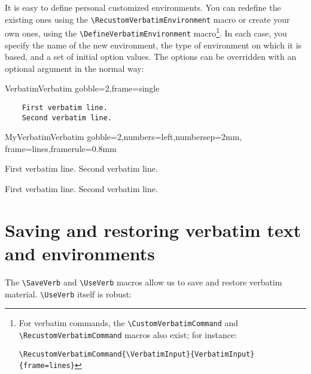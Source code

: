 \documentclass[twoside]{article}
\newif\ifChangeBar \ChangeBarfalse
\newcommand\cs[1]{\texttt{\textbackslash#1}}
\begin{document}
\ifChangeBar\begin{changebar}\fi
\VerbatimFootnotes
  It is easy to define personal customized environments. You can redefine
the existing ones using the \cs{RecustomVerbatimEnvironment} macro or create
your own ones, using the \cs{DefineVerbatimEnvironment} macro\footnote{%
\ifChangeBar\begin{changebar}\fi
For verbatim commands, the \cs{CustomVerbatimCommand} and
\cs{RecustomVerbatimCommand} macros also exist; for instance:

\noindent
\verb+\RecustomVerbatimCommand{\VerbatimInput}{VerbatimInput}{frame=lines}+
\ifChangeBar\end{changebar}\fi}.
In each case, you specify the name of the new environment, the type of
environment on which it is based, and a set of initial option values. The
options can be overridden with an optional argument in the normal way:

\begin{SideBySideExample}
  \RecustomVerbatimEnvironment
    {Verbatim}{Verbatim}
    {gobble=2,frame=single}
  \begin{Verbatim}
    First verbatim line.
    Second verbatim line.
  \end{Verbatim}
\end{SideBySideExample}
\ifChangeBar\end{changebar}\fi

\begin{SideBySideExample}
  \DefineVerbatimEnvironment%
    {MyVerbatim}{Verbatim}
    {gobble=2,numbers=left,numbersep=2mm,
     frame=lines,framerule=0.8mm}
  \begin{MyVerbatim}
    First verbatim line.
    Second verbatim line.
  \end{MyVerbatim}

  \begin{MyVerbatim}[numbers=none,
                     framerule=1pt]
    First verbatim line.
    Second verbatim line.
  \end{MyVerbatim}
\end{SideBySideExample}

\section{Saving and restoring verbatim text and environments}

  The \cs{SaveVerb} and \cs{UseVerb} macros allow us to save and restore
verbatim material. \cs{UseVerb} itself is robust:
\end{document}
